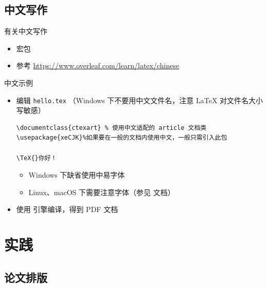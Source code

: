 \subsection{中文写作}
\begin{frame}{有关中文写作}
\begin{itemize}
    \item 宏包 
    \item 参考 \url{https://www.overleaf.com/learn/latex/chinese}
\end{itemize}
\end{frame}

\begin{frame}[fragile]{中文示例}
  
    \begin{itemize}
        \item 编辑 \texttt{hello.tex} （Windows 下不要用中文文件名，注意
        \LaTeX{} 对文件名大小写敏感）
        \lstset{language=[LaTeX]TeX}
        \begin{lstlisting}[basicstyle=\ttfamily]
\documentclass{ctexart} % 使用中文适配的 article 文档类
\usepackage{xeCJK}%如果要在一般的文档内使用中文，一般只需引入此包

\TeX{}你好！

          \end{lstlisting}
        \begin{itemize}
          \item Windows 下缺省使用中易字体
          \item Linux、macOS 下需要注意字体（参见  文档）
        \end{itemize}
      \item 使用 \XeLaTeX{} 引擎编译，得到 PDF 文档
        \begin{center}
        \end{center}
    \end{itemize}
\end{frame}
  

\section{实践}
\subsection{论文排版}


